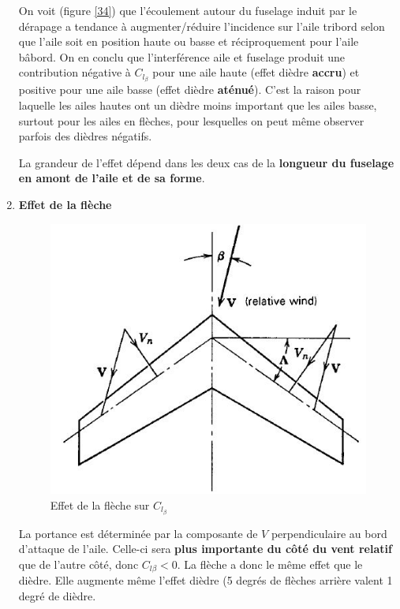 \documentclass{report}
\begin{document}
\begin{enumerate}
    On voit (figure \ref{34}) que l'écoulement autour du fuselage induit par le dérapage a tendance à augmenter/réduire l'incidence sur l'aile tribord selon que l'aile soit en position haute ou basse et réciproquement pour l'aile bâbord. On en conclu que l'interférence aile et fuselage produit une contribution négative à $C_{l_\beta}$ pour une aile haute (effet dièdre \textbf{accru}) et positive pour une aile basse (effet dièdre \textbf{aténué}). C'est la raison pour laquelle les ailes hautes ont un dièdre moins important que les ailes basse, surtout pour les ailes en flèches, pour lesquelles on peut même observer parfois des dièdres négatifs. 
    
    La grandeur de l'effet dépend dans les deux cas de la \textbf{longueur du fuselage en amont de l'aile et de sa forme}.
    
    \item \textbf{Effet de la flèche}\\
    
    \begin{figure}[h!]
    \centering
    \includegraphics[scale=0.6]{33.JPG}
    \caption{Effet de la flèche sur $C_{l_\beta}$}
    \label{33}
\end{figure}
    
    La portance est déterminée par la composante de $V$ perpendiculaire au bord d'attaque de l'aile. Celle-ci sera \textbf{plus importante du côté du vent relatif} que de l'autre côté, donc $C_{l\beta}<0$. La flèche a donc le même effet que le dièdre. Elle augmente même l'effet dièdre (5 degrés de flèches arrière valent 1 degré de dièdre. 


\end{enumerate}
\end{document}
